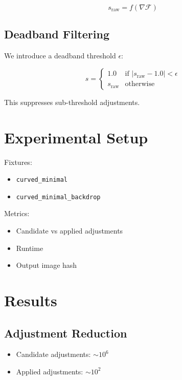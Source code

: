 \documentclass[11pt]{article}
\begin{document}
\begin{equation}
s_{\text{raw}} = f(\nabla \mathcal{F})
\end{equation}

\subsection{Deadband Filtering}

We introduce a deadband threshold $\epsilon$:

\begin{equation}
s =
\begin{cases}
1.0 & \text{if } |s_{\text{raw}} - 1.0| < \epsilon \\
s_{\text{raw}} & \text{otherwise}
\end{cases}
\end{equation}

This suppresses sub-threshold adjustments.

\section{Experimental Setup}

Fixtures:
\begin{itemize}
\item \texttt{curved\_minimal}
\item \texttt{curved\_minimal\_backdrop}
\end{itemize}

Metrics:
\begin{itemize}
\item Candidate vs applied adjustments
\item Runtime
\item Output image hash
\end{itemize}

\section{Results}

\subsection{Adjustment Reduction}

\begin{itemize}
\item Candidate adjustments: $\sim 10^6$
\item Applied adjustments: $\sim 10^2$
\end{itemize}
\end{document}
